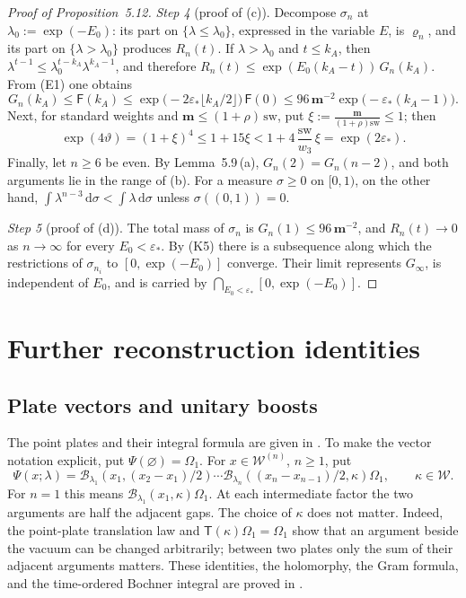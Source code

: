 \documentclass[11pt,letterpaper,reqno]{amsart}
\theoremstyle{definition}
\begin{document}
\begin{proof}[Proof of Proposition~5.12]
\emph{Step 4} (proof of (c)).
Decompose $\sigma_n$ at $\lambda_0:=\exp(-E_0)$: its part on $\{\lambda\le\lambda_0\}$, expressed in the variable $E$, is $\varrho_n$, and its part on $\{\lambda>\lambda_0\}$ produces $R_n(t)$.
If $\lambda>\lambda_0$ and $t\le k_A$, then $\lambda^{t-1}\le\lambda_0^{t-k_A}\lambda^{k_A-1}$, and therefore $R_n(t)\le\exp(E_0(k_A-t))\,G_n(k_A)$.
From (E1) one obtains
\begin{equation*}
G_n(k_A)\le\mathsf F(k_A)\le\exp\bigl(-2\varepsilon_*\lfloor k_A/2\rfloor\bigr)\,\mathsf F(0)\le96\,\mathbf m^{-2}\exp\bigl(-\varepsilon_*(k_A-1)\bigr).
\end{equation*}
Next, for standard weights and $\mathbf m\le(1+\rho)\,\mathrm{sw}$, put $\xi:=\frac{\mathbf m}{(1+\rho)\mathrm{sw}}\le1$; then
\begin{equation*}
\exp(4\vartheta)=(1+\xi)^4\le1+15\xi<1+4\,\frac{\mathrm{sw}}{w_3}\,\xi=\exp(2\varepsilon_*).
\end{equation*}
Finally, let $n\ge6$ be even.
By Lemma~5.9\,(a), $G_n(2)=G_n(n-2)$, and both arguments lie in the range of (b).
For a measure $\sigma\ge0$ on $[0,1)$, on the other hand, $\int\lambda^{n-3}\,\mathrm d\sigma<\int\lambda\,\mathrm d\sigma$ unless $\sigma((0,1))=0$.

\emph{Step 5} (proof of (d)).
The total mass of $\sigma_n$ is $G_n(1)\le96\,\mathbf m^{-2}$, and $R_n(t)\to0$ as $n\to\infty$ for every $E_0<\varepsilon_*$.
By (K5) there is a subsequence along which the restrictions of $\sigma_{n_i}$ to $[0,\exp(-E_0)]$ converge.
Their limit represents $G_\infty$, is independent of $E_0$, and is carried by $\bigcap_{E_0<\varepsilon_*}[0,\exp(-E_0)]$.
\end{proof}


\section{Further reconstruction identities}
\label{app:qcm-reconstruction}

\subsection{Plate vectors and unitary boosts}
\label{qcm:plate-complements}

The point plates and their integral formula are given in
\cite[Proposition~8.2]{QEDConstruction}. To make the vector notation
explicit, put $\Psi(\varnothing)=\Omega_1$. For
$x\in\mathcal W^{(n)}$, $n\ge1$, put
\[
 \Psi(x;\lambda)=\mathcal B_{\lambda_1}(x_1,(x_2-x_1)/2)
 \cdots\mathcal B_{\lambda_n}((x_n-x_{n-1})/2,\kappa)\Omega_1,
 \qquad\kappa\in\mathcal W.
\]
For $n=1$ this means
$\mathcal B_{\lambda_1}(x_1,\kappa)\Omega_1$.
At each intermediate factor the two arguments are half the adjacent
gaps. The choice of $\kappa$ does not matter. Indeed, the point-plate
translation law and $\mathsf T(\kappa)\Omega_1=\Omega_1$ show that
an argument beside the vacuum can be changed arbitrarily; between
two plates only the sum of their adjacent arguments matters.
These identities, the holomorphy, the Gram formula, and the
time-ordered Bochner integral are proved in
\cite[Section~8.3 and Proposition~8.3]{QEDConstruction}.
\end{document}
